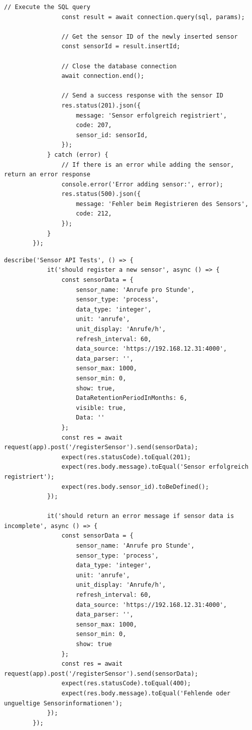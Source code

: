 \begin{lstlisting}[caption={Anmeldung eines neuen Sensors (Backend)}, style=js]
				// Execute the SQL query
				const result = await connection.query(sql, params);

				// Get the sensor ID of the newly inserted sensor
				const sensorId = result.insertId;

				// Close the database connection
				await connection.end();

				// Send a success response with the sensor ID
				res.status(201).json({
					message: 'Sensor erfolgreich registriert',
					code: 207,
					sensor_id: sensorId,
				});
			} catch (error) {
				// If there is an error while adding the sensor, return an error response
				console.error('Error adding sensor:', error);
				res.status(500).json({
					message: 'Fehler beim Registrieren des Sensors',
					code: 212,
				});
			}
		});
	\end{lstlisting}
\clearpage


	\begin{lstlisting}[caption={Anmeldung eines neuen Sensors (Backend) Unit-Tests}, style=js]
		describe('Sensor API Tests', () => {
			it('should register a new sensor', async () => {
				const sensorData = {
					sensor_name: 'Anrufe pro Stunde',
					sensor_type: 'process',
					data_type: 'integer',
					unit: 'anrufe',
					unit_display: 'Anrufe/h',
					refresh_interval: 60,
					data_source: 'https://192.168.12.31:4000',
					data_parser: '',
					sensor_max: 1000,
					sensor_min: 0,
					show: true,
					DataRetentionPeriodInMonths: 6,
					visible: true,
					Data: ''
				};
				const res = await request(app).post('/registerSensor').send(sensorData);
				expect(res.statusCode).toEqual(201);
				expect(res.body.message).toEqual('Sensor erfolgreich registriert');
				expect(res.body.sensor_id).toBeDefined();
			});

			it('should return an error message if sensor data is incomplete', async () => {
				const sensorData = {
					sensor_name: 'Anrufe pro Stunde',
					sensor_type: 'process',
					data_type: 'integer',
					unit: 'anrufe',
					unit_display: 'Anrufe/h',
					refresh_interval: 60,
					data_source: 'https://192.168.12.31:4000',
					data_parser: '',
					sensor_max: 1000,
					sensor_min: 0,
					show: true
				};
				const res = await request(app).post('/registerSensor').send(sensorData);
				expect(res.statusCode).toEqual(400);
				expect(res.body.message).toEqual('Fehlende oder ungueltige Sensorinformationen');
			});
		});
	\end{lstlisting}
\clearpage


